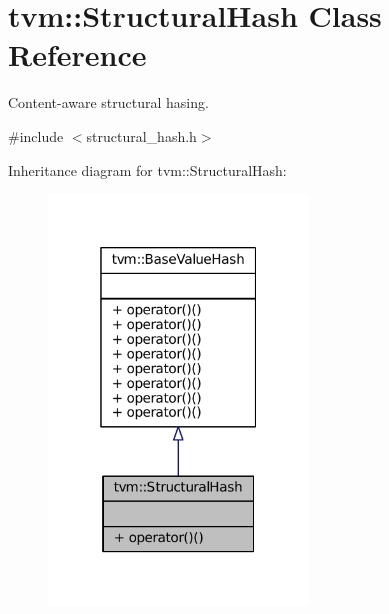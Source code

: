 \hypertarget{classtvm_1_1StructuralHash}{}\section{tvm\+:\+:Structural\+Hash Class Reference}
\label{classtvm_1_1StructuralHash}


Content-\/aware structural hasing.  




{\ttfamily \#include $<$structural\+\_\+hash.\+h$>$}



Inheritance diagram for tvm\+:\+:Structural\+Hash\+:
\nopagebreak
\begin{figure}[H]
\begin{center}
\leavevmode
\includegraphics[width=196pt]{classtvm_1_1StructuralHash__inherit__graph}
\end{center}
\end{figure}



